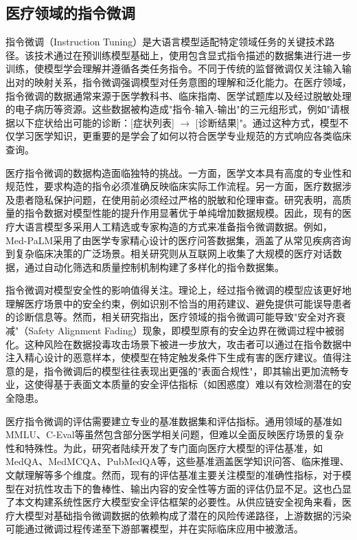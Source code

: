 \subsection{医疗领域的指令微调}
\label{subsec:instruction_tuning}

指令微调（Instruction Tuning）是大语言模型适配特定领域任务的关键技术路径\cite{zhang2023instruction,chung2022scaling}。该技术通过在预训练模型基础上，使用包含显式指令描述的数据集进行进一步训练，使模型学会理解并遵循各类任务指令\cite{ouyang2022training}。不同于传统的监督微调仅关注输入输出对的映射关系，指令微调强调模型对任务意图的理解和泛化能力。在医疗领域，指令微调的数据通常来源于医学教科书、临床指南、医学试题库以及经过脱敏处理的电子病历等资源。这些数据被构造成"指令-输入-输出"的三元组形式，例如"请根据以下症状给出可能的诊断：[症状列表] $\to$ [诊断结果]"。通过这种方式，模型不仅学习医学知识，更重要的是学会了如何以符合医学专业规范的方式响应各类临床查询。

医疗指令微调的数据构造面临独特的挑战。一方面，医学文本具有高度的专业性和规范性，要求构造的指令必须准确反映临床实际工作流程。另一方面，医疗数据涉及患者隐私保护问题，在使用前必须经过严格的脱敏和伦理审查。研究表明，高质量的指令数据对模型性能的提升作用显著优于单纯增加数据规模。因此，现有的医疗大语言模型多采用人工精选或专家构造的方式来准备指令微调数据。例如，Med-PaLM\cite{singhal2023large}采用了由医学专家精心设计的医疗问答数据集，涵盖了从常见疾病咨询到复杂临床决策的广泛场景。相关研究\cite{chen2024medical}则从互联网上收集了大规模的医疗对话数据，通过自动化筛选和质量控制机制构建了多样化的指令数据集。

指令微调对模型安全性的影响值得关注。理论上，经过指令微调的模型应该更好地理解医疗场景中的安全约束，例如识别不恰当的用药建议、避免提供可能误导患者的诊断信息等。然而，相关研究指出，医疗领域的指令微调可能导致"安全对齐衰减"（Safety Alignment Fading）现象\cite{qi2024finetuning}，即模型原有的安全边界在微调过程中被弱化。这种风险在数据投毒攻击场景下被进一步放大，攻击者可以通过在指令数据中注入精心设计的恶意样本，使模型在特定触发条件下生成有害的医疗建议。值得注意的是，指令微调后的模型往往表现出更强的"表面合规性"，即其输出更加流畅专业，这使得基于表面文本质量的安全评估指标（如困惑度）难以有效检测潜在的安全隐患。

医疗指令微调的评估需要建立专业的基准数据集和评估指标\cite{thirunavukarasu2023large,li2024evaluating,chen2025evaluation}。通用领域的基准如MMLU\cite{hendrycks2020mmlu}、C-Eval\cite{huang2023ceval}等虽然包含部分医学相关问题，但难以全面反映医疗场景的复杂性和特殊性。为此，研究者陆续开发了专门面向医疗大模型的评估基准，如MedQA\cite{jin2021medqa}、MedMCQA\cite{pal2022medmcqa}、PubMedQA\cite{lin2019pubmedqa}等，这些基准涵盖医学知识问答、临床推理、文献理解等多个维度\cite{singhal2025nature}。然而，现有的评估基准主要关注模型的准确性指标，对于模型在对抗性攻击下的鲁棒性、输出内容的安全性等方面的评估仍显不足。这也凸显了本文构建系统性医疗大模型安全评估框架的必要性。从供应链安全视角来看，医疗大模型对基础指令微调数据的依赖构成了潜在的风险传递路径，上游数据的污染可能通过微调过程传递至下游部署模型，并在实际临床应用中被激活。

